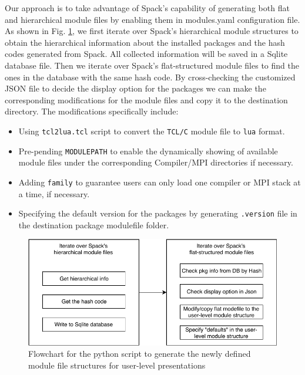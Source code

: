 \documentclass[conference]{IEEEtran}
\begin{document}
Our approach is to take advantage of Spack's capability of generating both flat and hierarchical module files by enabling them in modules.yaml configuration file. As shown in Fig. \ref{fig:modulefilter_flowchart}, we first iterate over Spack's hierarchical module structures to obtain the hierarchical information about the installed packages and the hash codes generated from Spack. All collected information will be saved in a Sqlite database file. Then we iterate over Spack's flat-structured module files to find the ones in the database with the same hash code. By cross-checking the customized JSON file to decide the display option for the packages we can make the corresponding modifications for the module files and copy it to the destination directory. The modifications specifically include:

\begin{itemize}
    \item Using \texttt{tcl2lua.tcl} script to convert the \texttt{TCL/C} module file to \texttt{lua} format.
    \item Pre-pending \texttt{MODULEPATH} to enable the dynamically showing of available module files under the corresponding Compiler/MPI directories if necessary.
    \item Adding \texttt{family} to guarantee users can only load one compiler or MPI stack at a time, if necessary.
    \item Specifying the default version for the packages by generating \texttt{.version} file in the destination package modulefile folder.
\end{itemize}

\begin{figure}[htbp]
  \centerline{\includegraphics[width=\linewidth]{figures/modulefilter_flowchart}}
  \caption{Flowchart for the python script to generate the newly defined module file structures for user-level presentations}
  \label{fig:modulefilter_flowchart}
\end{figure}
\end{document}
